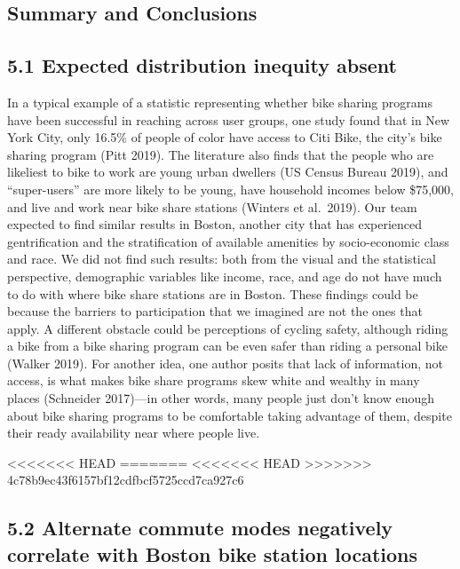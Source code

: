 \documentclass[
  12pt,
]{article}
\begin{document}
\begin{longtable}[]
\newpage

\hypertarget{summary-and-conclusions}{%
\section{Summary and Conclusions}\label{summary-and-conclusions}}

\hypertarget{expected-distribution-inequity-absent}{%
\subsection{5.1 Expected distribution inequity
absent}\label{expected-distribution-inequity-absent}}

In a typical example of a statistic representing whether bike sharing
programs have been successful in reaching across user groups, one study
found that in New York City, only 16.5\% of people of color have access
to Citi Bike, the city's bike sharing program (Pitt 2019). The
literature also finds that the people who are likeliest to bike to work
are young urban dwellers (US Census Bureau 2019), and ``super-users''
are more likely to be young, have household incomes below \$75,000, and
live and work near bike share stations (Winters et al.~2019). Our team
expected to find similar results in Boston, another city that has
experienced gentrification and the stratification of available amenities
by socio-economic class and race. We did not find such results: both
from the visual and the statistical perspective, demographic variables
like income, race, and age do not have much to do with where bike share
stations are in Boston. These findings could be because the barriers to
participation that we imagined are not the ones that apply. A different
obstacle could be perceptions of cycling safety, although riding a bike
from a bike sharing program can be even safer than riding a personal
bike (Walker 2019). For another idea, one author posits that lack of
information, not access, is what makes bike share programs skew white
and wealthy in many places (Schneider 2017)---in other words, many
people just don't know enough about bike sharing programs to be
comfortable taking advantage of them, despite their ready availability
near where people live.

<<<<<<< HEAD
=======
<<<<<<< HEAD
>>>>>>> 4c78b9ec43f6157bf12cdfbcf5725ccd7ca927c6
\hypertarget{alternate-commute-modes-negatively-correlate-with-boston-bike-station-locations}{%
\subsection{5.2 Alternate commute modes negatively correlate with Boston
bike station
locations}\label{alternate-commute-modes-negatively-correlate-with-boston-bike-station-locations}}


\end{longtable}
\end{document}
